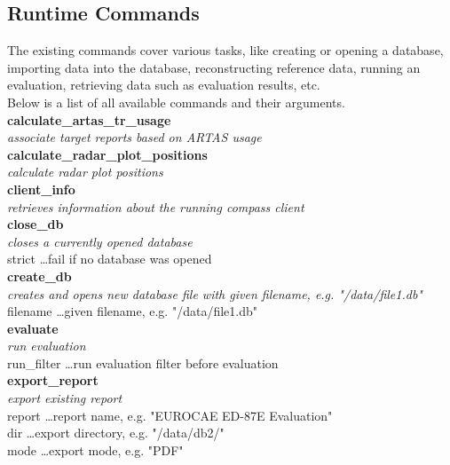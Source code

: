 \subsection{Runtime Commands}

The existing commands cover various tasks, like creating or opening a database,
importing data into the database, reconstructing reference data, running an evaluation,
retrieving data such as evaluation results, etc. \\

Below is a list of all available commands and their arguments. \\

\textbf{calculate\_artas\_tr\_usage} \\
\textit{associate target reports based on ARTAS usage} \\

\textbf{calculate\_radar\_plot\_positions} \\
\textit{calculate radar plot positions} \\

\textbf{client\_info} \\
\textit{retrieves information about the running compass client} \\

\textbf{close\_db} \\
\textit{closes a currently opened database} \\
strict \dots fail if no database was opened \\

\textbf{create\_db} \\
\textit{creates and opens new database file with given filename, e.g. "/data/file1.db"} \\
filename \dots given filename, e.g. "/data/file1.db" \\

\textbf{evaluate} \\
\textit{run evaluation} \\
run\_filter \dots run evaluation filter before evaluation \\

\textbf{export\_report} \\
\textit{export existing report} \\
report \dots report name, e.g. "EUROCAE ED-87E Evaluation" \\
dir \dots export directory, e.g. "/data/db2/" \\
mode \dots export mode, e.g. "PDF" \\


